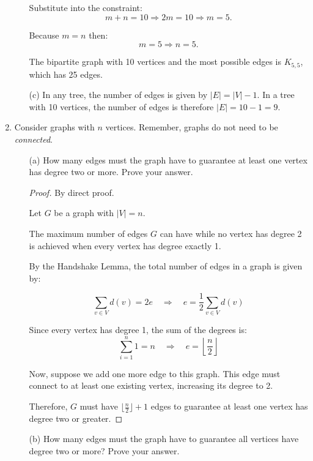 \documentclass[11pt, letterpaper, includehead]{article}
\theoremstyle{plain}
\theoremstyle{mydefinition}
\theoremstyle{myproperty}
\begin{document}
\begin{enumerate}[label=\textbf{\arabic*}., leftmargin=*]
\begin{enumerate}
        Substitute into the constraint:
        \[
        m + n = 10 \Rightarrow 2m = 10 \Rightarrow m = 5.
        \]

        Because $m = n$ then:
        \[
        m = 5 \Rightarrow n = 5.
        \]

            The bipartite graph with 10 vertices and the most possible edges is $K_{5, 5}$, which has 25 edges.
            \item[(c)] In any tree, the number of edges is given by $|E| = |V|-1$. In a tree with 10 vertices, the number of edges is therefore $|E| = 10-1 = 9$.
          \end{enumerate}
    \item Consider graphs with $n$ vertices. Remember, graphs do not need to be
          \emph{connected}.
          \begin{enumerate}[leftmargin=*]
              \item[(a)] How many edges must the graph have to guarantee at
                  least one vertex
                  has degree two or more. Prove your answer.

                  \begin{proof}

                    By direct proof.

                    Let $G$ be a graph with $|V| = n$. 
                    
                    The maximum number of edges $G$ can have while no vertex has degree 2 is achieved when every vertex has degree exactly 1.

                    By the Handshake Lemma, the total number of edges in a graph is given by:

                    \[
                    \sum_{v \in V} d(v) = 2e \quad \Rightarrow \quad e = \frac{1}{2} \sum_{v \in V} d(v)
                    \]

                    Since every vertex has degree 1, the sum of the degrees is:
                    \[
                    \sum_{i=1}^{n} 1 = n \quad \Rightarrow \quad e = \left\lfloor \frac{n}{2} \right\rfloor
                    \]

                    Now, suppose we add one more edge to this graph. This edge must connect to at least one existing vertex, increasing its degree to 2.
                
                    Therefore, $G$ must have $\lfloor \frac{n}{2} \rfloor + 1$ edges to guarantee at
                    least one vertex has degree two or greater.
                  \end{proof}
              \item[(b)] How many edges must the graph have to guarantee all vertices
                  have degree two or more? Prove your answer.


\end{enumerate}
\end{enumerate}
\end{document}
